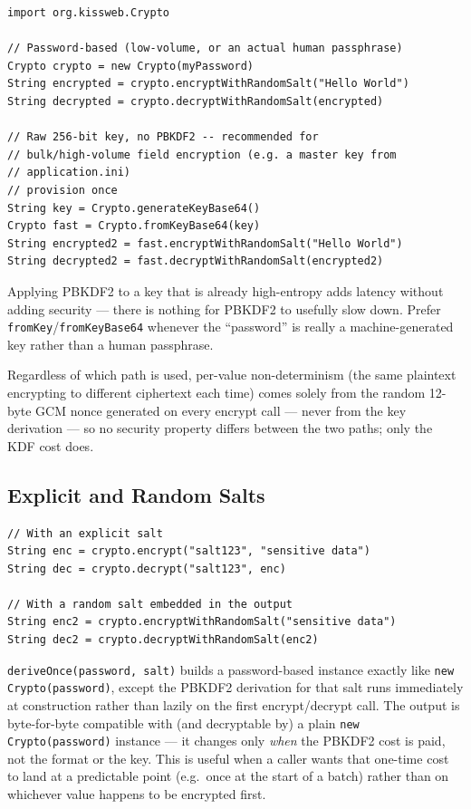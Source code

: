 \begin{lstlisting}[style=groovy]
import org.kissweb.Crypto

// Password-based (low-volume, or an actual human passphrase)
Crypto crypto = new Crypto(myPassword)
String encrypted = crypto.encryptWithRandomSalt("Hello World")
String decrypted = crypto.decryptWithRandomSalt(encrypted)

// Raw 256-bit key, no PBKDF2 -- recommended for
// bulk/high-volume field encryption (e.g. a master key from
// application.ini)
// provision once
String key = Crypto.generateKeyBase64()
Crypto fast = Crypto.fromKeyBase64(key)
String encrypted2 = fast.encryptWithRandomSalt("Hello World")
String decrypted2 = fast.decryptWithRandomSalt(encrypted2)
\end{lstlisting}

\begin{tipbox}
Applying PBKDF2 to a key that is already high-entropy adds latency without adding security --- there is nothing for PBKDF2 to usefully slow down.  Prefer \texttt{fromKey}/\texttt{fromKeyBase64} whenever the ``password'' is really a machine-generated key rather than a human passphrase.
\end{tipbox}

\noindent
Regardless of which path is used, per-value non-determinism (the same plaintext encrypting to different ciphertext each time) comes solely from the random 12-byte GCM nonce generated on every encrypt call --- never from the key derivation --- so no security property differs between the two paths; only the KDF cost does.

\subsection{Explicit and Random Salts}

\begin{lstlisting}[style=groovy]
// With an explicit salt
String enc = crypto.encrypt("salt123", "sensitive data")
String dec = crypto.decrypt("salt123", enc)

// With a random salt embedded in the output
String enc2 = crypto.encryptWithRandomSalt("sensitive data")
String dec2 = crypto.decryptWithRandomSalt(enc2)
\end{lstlisting}

\noindent
\texttt{deriveOnce(password, salt)} builds a password-based instance exactly like \texttt{new Crypto(password)}, except the PBKDF2 derivation for that salt runs immediately at construction rather than lazily on the first encrypt/decrypt call.  The output is byte-for-byte compatible with (and decryptable by) a plain \texttt{new Crypto(password)} instance --- it changes only \emph{when} the PBKDF2 cost is paid, not the format or the key.  This is useful when a caller wants that one-time cost to land at a predictable point (e.g.\ once at the start of a batch) rather than on whichever value happens to be encrypted first.

